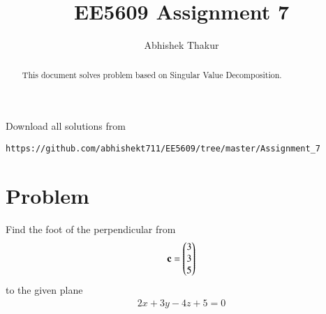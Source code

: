 \documentclass[journal,12pt,twocolumn]{IEEEtran}
\begin{document}
     \def\rightbox#1{\makebox[0in][r]{#1}}
     \def\centbox#1{\makebox[0in]{#1}}
     \def\topbox#1{\raisebox{-\baselineskip}[0in][0in]{#1}}
     \def\midbox#1{\raisebox{-0.5\baselineskip}[0in][0in]{#1}}
\vspace{3cm}
\title{EE5609 Assignment 7}
\author{Abhishek Thakur}
\maketitle
\newpage
\bigskip
\renewcommand{\thefigure}{\theenumi}
\renewcommand{\thetable}{\theenumi}
\begin{abstract}
This document solves problem based on Singular Value Decomposition.
\end{abstract}
\vspace{0.5cm}
%
Download all solutions from 
\begin{lstlisting}
https://github.com/abhishekt711/EE5609/tree/master/Assignment_7 
\end{lstlisting}
%
%
\vspace{0.5mm}
\section{Problem}
Find the foot of the perpendicular from
\begin{align}
\mathbf{c}=\begin{pmatrix}3\\3\\5\end{pmatrix}
\end{align}
to the given plane
\begin{align}
2x+3y-4z+5=0 
\end{align}
\end{document}
